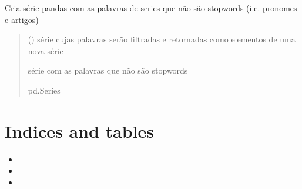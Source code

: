 \documentclass[letterpaper,10pt,english]{sphinxmanual}
\begin{document}
\begin{fulllineitems}
\label{\detokenize{index:functions.words_n_stopwords}}
\pysigstartsignatures
{}
\pysigstopsignatures
\sphinxAtStartPar
Cria série pandas com as palavras de series que não são stopwords (i.e. pronomes e artigos)
\begin{quote}\begin{description}
\sphinxAtStartPar
{} () \textendash{} série cujas palavras serão filtradas e retornadas como elementos de uma nova série

\sphinxAtStartPar
série com as palavras que não são stopwords

\sphinxAtStartPar
pd.Series

\end{description}\end{quote}

\end{fulllineitems}



\chapter{Indices and tables}
\label{\detokenize{index:indices-and-tables}}\begin{itemize}
\item {} 
\sphinxAtStartPar
{}

\item {} 
\sphinxAtStartPar
{}

\item {} 
\sphinxAtStartPar
{}

\end{itemize}


\renewcommand{\indexname}{Python Module Index}
\begin{sphinxtheindex}
\let\bigletter\sphinxstyleindexlettergroup
\bigletter{f}
\item\relax{}
\end{sphinxtheindex}

\renewcommand{\indexname}{Index}
\printindex
\end{document}
